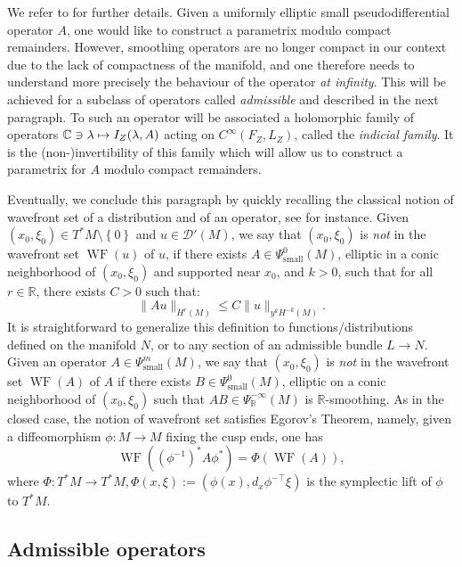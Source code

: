 \documentclass[JEP,XML,SOM,Unicode,NoFloatCountersInSection]{cedram}
\newcommand\mto{\mathchoice{\longmapsto}{\mapsto}{\mapsto}{\mapsto}}
\newcommand{\C}{\mathbb{C}}
\newcommand{\R}{\mathbb{R}}
\newcommand{\mc}{\mathcal}
\DeclareMathOperator{\WF}{WF}
\theoremstyle{plain}
\theoremstyle{definition}
\begin{document}
We refer to \cite[\S\S 2 \& 3]{Bonthonneau-Lefeuvre-19-1} for further details. Given a uniformly elliptic small pseudodifferential operator $A$, one would like to construct a parametrix modulo compact remainders. However, smoothing operators are no longer compact in our context due to the lack of compactness of the manifold, and one therefore needs to understand more precisely the behaviour of the operator \emph{at infinity}. This will be achieved for a subclass of operators called \emph{admissible} and described in the next paragraph. To such an operator will be associated a holomorphic family of operators $\C \ni \lambda \mto I_Z(\lambda,A)$ acting on $C^\infty(F_Z,L_Z)$, called the \emph{indicial family}. It is the (non-)invertibility of this family which will allow us to construct a parametrix for $A$ modulo compact remainders.

Eventually, we conclude this paragraph by quickly recalling the classical notion of wavefront set of a distribution and of an operator, see \cite{Grigis-Sjostrand-94} for instance. Given $(x_0,\xi_0) \in T^*M \setminus \left\{0 \right\}$ and $u \in \mc{D}'(M)$, we say that $(x_0,\xi_0)$ is \emph{not} in the wavefront set $\WF(u)$ of $u$, if there exists $A \in \Psi^0_{\mathrm{small}}(M)$, elliptic in a conic neighborhood of $(x_0,\xi_0)$ and supported near $x_0$, and $k > 0$, such that for all $r \in \R$, there exists $C > 0$ such that:
\[
\|Au\|_{H^r(M)} \leq C \|u\|_{y^k H^{-k}(M)}.
\]
It is straightforward to generalize this definition to functions/distributions defined on the manifold $N$, or to any section of an admissible bundle $L \to N$. Given an operator $A \in \Psi^m_{\mathrm{small}}(M)$, we say that $(x_0,\xi_0)$ is \emph{not} in the wavefront set $\WF(A)$ of $A$ if there exists $B \in \Psi^0_{\mathrm{small}}(M)$, elliptic on a conic neighborhood of $(x_0,\xi_0)$ such that $AB \in \Psi^{-\infty}_{\R}(M)$ is $\R$-smoothing. As in the closed case, the notion of wavefront set satisfies Egorov's Theorem, namely, given a diffeomorphism $\phi : M \to M$ fixing the cusp ends, one has
\begin{equation}
\label{equation:egorov}
\WF((\phi^{-1})^*A\phi^*) = \Phi(\WF(A)),
\end{equation}
where $\Phi : T^*M \to T^*M, \Phi(x,\xi) := (\phi(x), d_x\phi^{-\top}\xi)$ is the symplectic lift of $\phi$ to $T^*M$.

\subsection{Admissible operators}
\end{document}
